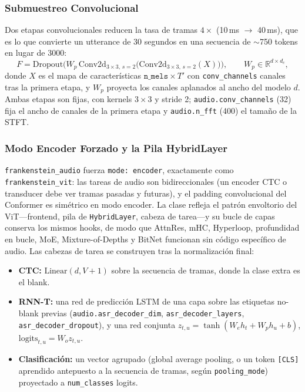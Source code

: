 \subsubsection{Submuestreo Convolucional}

Dos etapas convolucionales reducen la tasa de tramas $4\times$ (10\,ms $\to$ 40\,ms), que es lo que convierte un utterance de 30 segundos en una secuencia de $\sim$750 tokens en lugar de 3000:
\begin{equation}
F = \mathrm{Dropout}\Big(W_p\,\mathrm{Conv2d}_{3\times3,\,s=2}\big(\mathrm{Conv2d}_{3\times3,\,s=2}(X)\big)\Big),
\qquad W_p \in \mathbb{R}^{d \times d_c},
\label{eq:audio-subsampling}
\end{equation}
donde $X$ es el mapa de características $\texttt{n\_mels} \times T'$ con \texttt{conv\_channels} canales tras la primera etapa, y $W_p$ proyecta los canales aplanados al ancho del modelo $d$. Ambas etapas son fijas, con kernels $3\times3$ y stride 2; \texttt{audio.conv\_channels} (32) fija el ancho de canales de la primera etapa y \texttt{audio.n\_fft} (400) el tamaño de la STFT.

\subsubsection{Modo Encoder Forzado y la Pila HybridLayer}

\texttt{frankenstein\_audio} fuerza \texttt{mode: encoder}, exactamente como \texttt{frankenstein\_vit}: las tareas de audio son bidireccionales (un encoder CTC o transducer debe ver tramas pasadas y futuras), y el padding convolucional del Conformer es simétrico en modo encoder. La clase refleja el patrón envoltorio del ViT---frontend, pila de \texttt{HybridLayer}, cabeza de tarea---y su bucle de capas conserva los mismos hooks, de modo que AttnRes, mHC, Hyperloop, profundidad en bucle, MoE, Mixture-of-Depths y BitNet funcionan sin código específico de audio. Las cabezas de tarea se construyen tras la normalización final:

\begin{itemize}[leftmargin=*]
    \item \textbf{CTC:} $\mathrm{Linear}(d, V+1)$ sobre la secuencia de tramas, donde la clase extra es el blank.
    \item \textbf{RNN-T:} una red de predicción LSTM de una capa sobre las etiquetas no-blank previas (\texttt{audio.asr\_decoder\_dim}, \texttt{asr\_decoder\_layers}, \texttt{asr\_decoder\_dropout}), y una red conjunta $z_{t,u} = \tanh(W_e h_t + W_p h_u + b)$, $\mathrm{logits}_{t,u} = W_o z_{t,u}$.
    \item \textbf{Clasificación:} un vector agrupado (global average pooling, o un token \texttt{[CLS]} aprendido antepuesto a la secuencia de tramas, según \texttt{pooling\_mode}) proyectado a \texttt{num\_classes} logits.
\end{itemize}

